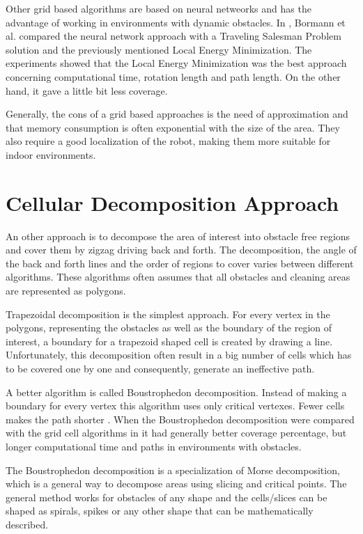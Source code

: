 Other grid based algorithms are based on neural netweorks \cite{1262545} and has the advantage of working in environments with dynamic obstacles. In \cite{eriksurvey}, Bormann et al. compared the neural network approach with a Traveling Salesman Problem solution and the previously mentioned Local Energy Minimization. The experiments showed that the Local Energy Minimization was the best approach concerning computational time, rotation length and path length. On the other hand, it gave a little bit less coverage.

Generally, the cons of a grid based approaches is the need of approximation and that memory consumption is often exponential with the size of the area. They also require a good localization of the robot, making them more suitable for indoor environments. \cite{mattiassurvey}

\section{Cellular Decomposition Approach}
\label{rel_work_cellularapproach}

An other approach is to decompose the area of interest into obstacle free regions and cover them by zigzag driving back and forth. The decomposition, the angle of the back and forth lines and the order of regions to cover varies between different algorithms. These algorithms often assumes that all obstacles and cleaning areas are represented as polygons. \cite{mattiassurvey}

Trapezoidal decomposition is the simplest approach. For every vertex in the polygons, representing the obstacles as well as the boundary of the region of interest, a boundary for a trapezoid shaped cell is created by drawing a line. Unfortunately, this decomposition often result in a big number of cells which has to be covered one by one and consequently, generate an ineffective path. \cite{robotbook}

A better algorithm is called Boustrophedon decomposition. Instead of making a boundary for every vertex this algorithm uses only critical vertexes. Fewer cells makes the path shorter \cite{robotbook}. When the Boustrophedon decomposition were compared with the grid cell algorithms in \cite{eriksurvey} it had generally better coverage percentage, but longer computational time and paths in environments with obstacles.

The Boustrophedon decomposition is a specialization of Morse decomposition, which is a general way to decompose areas using slicing and critical points. The general method works for obstacles of any shape and the cells/slices can be shaped as spirals, spikes or any other shape that can be mathematically described. \cite{robotbook}

